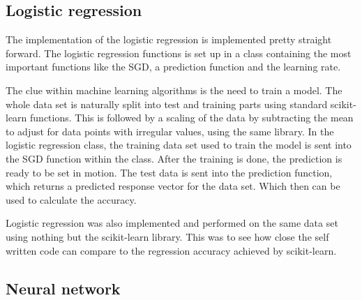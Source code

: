 \documentclass[../main.tex]{subfiles}
\begin{document}
\subsection{Logistic regression}\label{sec:3logreg}
The implementation of the logistic regression is implemented pretty straight forward. The logistic regression functions is set up in a class containing the most important functions like the SGD, a prediction function and the learning rate.

The clue within machine learning algorithms is the need to train a model. The whole data set is naturally split into test and training parts using standard scikit-learn functions. This is followed by a scaling of the data by subtracting the mean to adjust for data points with irregular values, using the same library. In the logistic regression class, the training data set used to train the model is sent into the SGD function within the class. After the training is done, the prediction is ready to be set in motion. The test data is sent into the prediction function, which returns a predicted response vector for the data set. Which then can be used to calculate the accuracy.

Logistic regression was also implemented and performed on the same data set using nothing but the scikit-learn library. This was to see how close the self written code can compare to the regression accuracy achieved by scikit-learn.

\subsection{Neural network}
\end{document}

